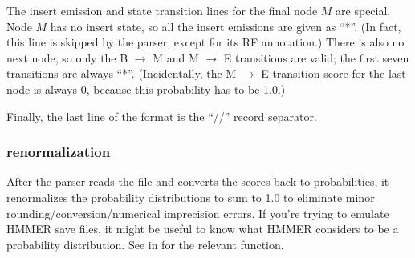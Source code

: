 The insert emission and state transition lines for the final node $M$
are special.  Node $M$ has no insert state, so all the insert
emissions are given as ``*''. (In fact, this line is skipped by the
parser, except for its RF annotation.) There is also no next node, so
only the B $\rightarrow$ M and M $\rightarrow$ E transitions are
valid; the first seven transitions are always ``*''.  (Incidentally,
the M $\rightarrow$ E transition score for the last node is always 0,
because this probability has to be 1.0.)

Finally, the last line of the format is the ``//'' record separator.

\subsubsection{renormalization}

After the parser reads the file and converts the scores back to
probabilities, it renormalizes the probability distributions to sum to
1.0 to eliminate minor rounding/conversion/numerical imprecision
errors.  If you're trying to emulate HMMER save files, it might be
useful to know what HMMER considers to be a probability
distribution. See
 in  for the relevant
function.


